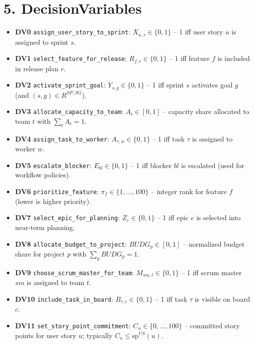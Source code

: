 \documentclass[11pt,a4paper]{article}
\begin{document}
\section{5. DecisionVariables}
\begin{itemize}[leftmargin=2em]
  \item \textbf{DV0} \texttt{assign\_user\_story\_to\_sprint}: $X_{u,s}\in\{0,1\}$ – 1 iff user story $u$ is assigned to sprint $s$.
  \item \textbf{DV1} \texttt{select\_feature\_for\_release}: $R_{f,r}\in\{0,1\}$ – 1 iff feature $f$ is included in release plan $r$.
  \item \textbf{DV2} \texttt{activate\_sprint\_goal}: $Y_{s,g}\in\{0,1\}$ – 1 iff sprint $s$ activates goal $g$ (and $(s,g)\in R^{SP,SG}$).
  \item \textbf{DV3} \texttt{allocate\_capacity\_to\_team}: $A_t\in[0,1]$ – capacity share allocated to team $t$ with $\sum_{t}A_t=1$.
  \item \textbf{DV4} \texttt{assign\_task\_to\_worker}: $A_{\tau,w}\in\{0,1\}$ – 1 iff task $\tau$ is assigned to worker $w$.
  \item \textbf{DV5} \texttt{escalate\_blocker}: $E_{bl}\in\{0,1\}$ – 1 iff blocker $bl$ is escalated (used for workflow policies).
  \item \textbf{DV6} \texttt{prioritize\_feature}: $\pi_f\in\{1,\dots,100\}$ – integer rank for feature $f$ (lower is higher priority).
  \item \textbf{DV7} \texttt{select\_epic\_for\_planning}: $Z_e\in\{0,1\}$ – 1 iff epic $e$ is selected into near-term planning.
  \item \textbf{DV8} \texttt{allocate\_budget\_to\_project}: $BUDG_p\in[0,1]$ – normalized budget share for project $p$ with $\sum_{p}BUDG_p=1$.
  \item \textbf{DV9} \texttt{choose\_scrum\_master\_for\_team}: $M_{sm,t}\in\{0,1\}$ – 1 iff scrum master $sm$ is assigned to team $t$.
  \item \textbf{DV10} \texttt{include\_task\_in\_board}: $B_{\tau,c}\in\{0,1\}$ – 1 iff task $\tau$ is visible on board $c$.
  \item \textbf{DV11} \texttt{set\_story\_point\_commitment}: $C_u\in\{0,\dots,100\}$ – committed story points for user story $u$; typically $C_u\le \mathrm{sp}^{US}(u)$.
\end{itemize}
\end{document}

